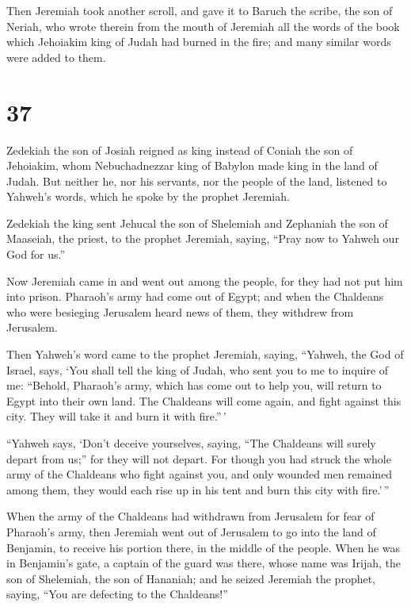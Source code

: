 Then Jeremiah took another scroll, and gave it to Baruch
the scribe, the son of Neriah, who wrote therein from the mouth of
Jeremiah all the words of the book which Jehoiakim king of Judah had
burned in the fire; and many similar words were added to them.

\hypertarget{section-36}{%
\section{37}\label{section-36}}

 Zedekiah the son of Josiah reigned as king instead of
Coniah the son of Jehoiakim, whom Nebuchadnezzar king of Babylon made
king in the land of Judah.  But neither he, nor his
servants, nor the people of the land, listened to Yahweh's words, which
he spoke by the prophet Jeremiah.

 Zedekiah the king sent Jehucal the son of Shelemiah and
Zephaniah the son of Maaseiah, the priest, to the prophet Jeremiah,
saying, ``Pray now to Yahweh our God for us.''

 Now Jeremiah came in and went out among the people, for
they had not put him into prison.  Pharaoh's army had come
out of Egypt; and when the Chaldeans who were besieging Jerusalem heard
news of them, they withdrew from Jerusalem.

 Then Yahweh's word came to the prophet Jeremiah, saying,
 ``Yahweh, the God of Israel, says, `You shall tell the
king of Judah, who sent you to me to inquire of me: ``Behold, Pharaoh's
army, which has come out to help you, will return to Egypt into their
own land.  The Chaldeans will come again, and fight
against this city. They will take it and burn it with fire.''\,'

 ``Yahweh says, `Don't deceive yourselves, saying, ``The
Chaldeans will surely depart from us;'' for they will not depart.
 For though you had struck the whole army of the
Chaldeans who fight against you, and only wounded men remained among
them, they would each rise up in his tent and burn this city with
fire.'\,''

 When the army of the Chaldeans had withdrawn from
Jerusalem for fear of Pharaoh's army,  then Jeremiah went
out of Jerusalem to go into the land of Benjamin, to receive his portion
there, in the middle of the people.  When he was in
Benjamin's gate, a captain of the guard was there, whose name was
Irijah, the son of Shelemiah, the son of Hananiah; and he seized
Jeremiah the prophet, saying, ``You are defecting to the Chaldeans!''

